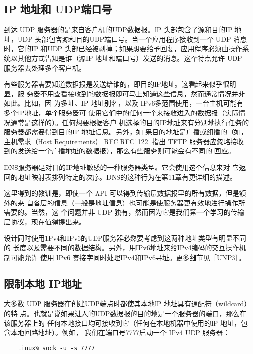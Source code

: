 \subsection{IP 地址和 UDP端口号}
到达 UDP 服务器的是来自客户机的UDP数据报。IP 头部包含了源和目的IP 地址，UDP
头部包含源和目的UDP端口号。当一个应用程序接收到一个 UDP 消息时，它的IP 和UDP
头部已经被剥掉；如果想要给予回复，应用程序必须由操作系统以其他方式告知是谁（源IP
地址和端口号）发送的消息。这个特点允许 UDP 服务器去处理多个客户机。

有些服务器需要知道数据报是发送给谁的，即目的IP地址。这看起来似乎很明显，服
务器不用查看接收到的数据报即可马上知道这些信息，然而通常情况并非如此。比如，因
为多址、IP 地址别名，以及 IPv6多范围使用，一台主机可能有多个IP地址，单个服务器可
使用它们中的任何一个来接收进入的数据报（实际情况通常是这样的）。任何想要根据客户
机选择的目的IP地址来有分别地执行任务的服务器都需要得到目的IP 地址信息。另外，如
果目的地址是广播或组播的（如，主机需求（Host Requirements） RFC\href{https://www.rfc-editor.org/rfc/rfc1122}{[RFC1122]} 指出 TFTP
服务器应忽略接收到的发送给一个广播地址的数据报），那么有些服务则可能会有不同的
回应。

\begin{tcolorbox}    
DNS服务器是对目的IP地址敏感的一种服务器类型。它会使用这个信息来对
它返回的地址映射表排列特定的次序。DNS的这种行为在第11章有更详细的描述。
\end{tcolorbox}

这里得到的教训是，即使一个 API 可以得到传输层数据报里的所有数据，但是额外的来
自各层的信息（一般是地址信息）也可能是使服务器更有效地进行操作所需要的。当然，这
个问题并非 UDP 独有，然而因为它是我们第一个学习的传输层协议，现在值得提出来。

设计同时使用1Pv4和IPv6的UDP服务器必然要考虑到这两种地址类型有明显不同的
长度以及需要不同的数据结构。另外，用IPv6地址来给IPv4编码的交互操作机制可能允许
使用 IPv6 套接字同时处理IPv4和IPv6寻址。更多细节见［UNP3］。

\subsection{限制本地 IP地址}
大多数 UDP 服务器在创建UDP端点时都使其本地IP 地址具有通配符（wildcard）的特
点。也就是说如果进人的UDP数据报的目的地是一个服务器的端口，那么在该服务器上的
任何本地接口均可接收到它（任何在本地机器中使用的IP 地址，包含本地回路地址）。例如，
我们在端口号7777启动一个 IPv4 UDP 服务器：

\begin{verbatim}
    Linux% sock -u -s 7777
\end{verbatim}

